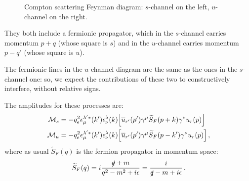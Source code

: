 \documentclass[main.tex]{subfiles}
\begin{document}
\begin{figure}[ht]
\centering
{}\qquad
{}
\caption{Compton scattering Feynman diagram: \(s\)-channel on the left, \(u\)-channel on the right.}
\label{fig:compton-scattering-feynman}
\end{figure}


They both include a fermionic propagator, which in the \(s\)-channel carries momentum \(p+q\) (whose square is \(s\)) and in the \(u\)-channel carries momentum \(p - q'\) (whose square is \(u\)). 

The fermionic lines in the \(u\)-channel diagram are the same as the ones in the \(s\)-channel one: so, we expect the contributions of these two to constructively interfere, without relative signs. 

The amplitudes for these processes are: 
%
\begin{align}
\mathcal{M}_{s} &= - q_e^2 
\epsilon^{\lambda^{\prime} *}_{\mu } (k')
\epsilon^{\lambda }_{\nu } (k)
\qty[
\overline{u}_{r'} (p') \gamma^{\mu }
\widetilde{S}_{F} (p+k) \gamma^{\nu }  u_r (p) 
] \\
\mathcal{M}_{u} &= - q_e^2 
\epsilon^{\lambda^{\prime} *}_{\mu } (k')
\epsilon^{\lambda }_{\nu } (k)
\qty[
\overline{u}_{r'} (p') \gamma^{\mu }
\widetilde{S}_{F} (p-k') \gamma^{\nu }  u_r (p) 
]
\,,
\end{align}
%
where as usual \(\widetilde{S}_F (q)\) is the fermion propagator in momentum space: 
%
\begin{align}
\widetilde{S}_{F} (q) = i \frac{\slashed{q} + m}{q^2 - m^2 + i \epsilon } = \frac{i}{\slashed{q} - m + i \epsilon }
\,.
\end{align}
\end{document}
